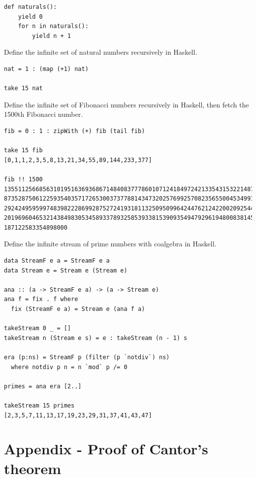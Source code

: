 \documentclass{article}
\begin{document}
\lstset{frame=single, language=Python}
\begin{lstlisting}
def naturals():
    yield 0
    for n in naturals():
        yield n + 1
\end{lstlisting}

Define the infinite set of natural numbers recursively in Haskell.

\lstset{frame=single, language=Haskell}
\begin{lstlisting}
nat = 1 : (map (+1) nat)

take 15 nat
\end{lstlisting}

Define the infinite set of Fibonacci numbers recursively in Haskell, then fetch the 1500th Fibonacci number.

\lstset{frame=single, language=Haskell}
\begin{lstlisting}
fib = 0 : 1 : zipWith (+) fib (tail fib)

take 15 fib
[0,1,1,2,3,5,8,13,21,34,55,89,144,233,377]

fib !! 1500
13551125668563101951636936867148408377786010712418497242133543153221487310
87352875061225935403571726530037377881434732025769925708235655004534991410
29242495959974839822286992875272419318113250950996424476212422002092544399
20196960465321438498305345893378932585393381539093549479296194800838145996
187122583354898000
\end{lstlisting}

Define the infinite stream of prime numbers with coalgebra in Haskell.

\lstset{frame=single, language=Haskell}
\begin{lstlisting}
data StreamF e a = StreamF e a
data Stream e = Stream e (Stream e)

ana :: (a -> StreamF e a) -> (a -> Stream e)
ana f = fix . f where
  fix (StreamF e a) = Stream e (ana f a)

takeStream 0 _ = []
takeStream n (Stream e s) = e : takeStream (n - 1) s

era (p:ns) = StreamF p (filter (p `notdiv`) ns)
  where notdiv p n = n `mod` p /= 0

primes = ana era [2..]

takeStream 15 primes
[2,3,5,7,11,13,17,19,23,29,31,37,41,43,47]
\end{lstlisting}

\section{Appendix - Proof of Cantor's theorem}
\end{document}
